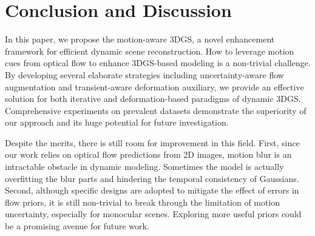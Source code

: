\documentclass[runningheads]{llncs}
\begin{document}
\begin{table}[t]
  \centering
  \caption{\textbf{Ablations on the components of our proposed framework.}
  }
  \label{tab:ablation}%
\end{table}%

\section{Conclusion and Discussion}

In this paper, we propose the motion-aware 3DGS, a novel enhancement framework for efficient dynamic scene reconstruction.
How to leverage motion cues from optical flow to enhance 3DGS-based modeling is a non-trivial challenge. By developing several elaborate strategies including uncertainty-aware flow augmentation and transient-aware deformation auxiliary, we provide an effective solution for both iterative and deformation-based paradigms of dynamic 3DGS.
Comprehensive experiments on prevalent datasets demonstrate the superiority of our approach and its huge potential for future investigation.

Despite the merits, there is still room for improvement in this field.
First, since our work relies on optical flow predictions from 2D images, motion blur is an intractable obstacle in dynamic modeling. Sometimes the model is actually overfitting the blur parts and hindering the temporal consistency of Gaussians.
Second, although specific designs are adopted to mitigate the effect of errors in flow priors, it is still non-trivial to break through the limitation of motion uncertainty, especially for monocular scenes. Exploring more useful priors could be a promising avenue for future work.


%
%


\end{document}
